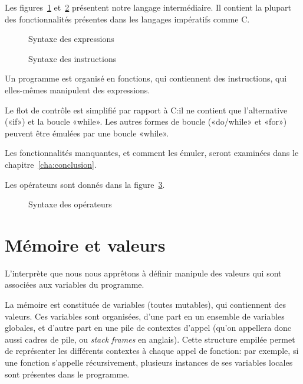 Les figures~\ref{fig:stx-data} et~\ref{fig:stx} présentent
notre langage intermédiaire. Il contient la plupart des fonctionnalités
présentes dans les langages impératifs comme C.

\begin{figure}%

  \figstxdata{}

  \caption{Syntaxe des expressions}
\label{fig:stx-data}
\end{figure}%

\begin{figure}%

  \figstxinstr{}

  \caption{Syntaxe des instructions}
\label{fig:stx}
\end{figure}%

Un programme est organisé en fonctions, qui contiennent des instructions, qui
elles-mêmes manipulent des expressions.

Le flot de contrôle est simplifié par rapport à C:\@ il ne contient que
l'alternative («if») et la boucle «while». Les autres formes de boucle
(«do/while» et «for») peuvent être émulées par une boucle «while».

Les fonctionnalités manquantes, et comment les émuler, seront examinées dans le
chapitre~\ref{cha:conclusion}.

Les opérateurs sont donnés dans la figure~\ref{fig:stx-ops}.

\begin{figure}[h]%

  \figstxops{}

  \caption{Syntaxe des opérateurs}
\label{fig:stx-ops}
\end{figure}%

\section{Mémoire et valeurs}

L'interprète que nous nous apprêtons à définir manipule des valeurs qui sont
associées aux variables du programme.

La mémoire est constituée de variables (toutes mutables), qui contiennent des
valeurs. Ces variables sont organisées, d'une part en un ensemble de variables
globales, et d'autre part en une pile de contextes d'appel (qu'on appellera donc
aussi cadres de pile, ou \emph{stack frames} en anglais). Cette structure
empilée permet de représenter les différents contextes à chaque appel de
fonction: par exemple, si une fonction s'appelle récursivement, plusieurs
instances de ses variables locales sont présentes dans le programme.

